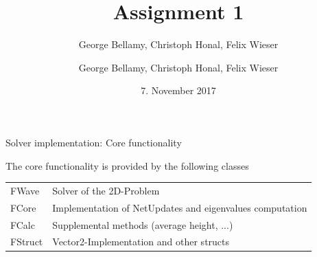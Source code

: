 \documentclass[shortpres]{beamer}
\title[{Tsunami simulation}]{Assignment 1}
\author[Bellamy Honal, Wieser]{George Bellamy, Christoph Honal, Felix Wieser\\\vspace{10pt}{\small Bachelorpraktikum}}
\institute[TU M\"unchen]{Techncal University of Munich}
\author[Bellamy, Honal, Wieser]{George Bellamy, Christoph Honal, Felix Wieser\\\vspace{10pt}{\small Bachelorpraktikum}}
\institute[TU M\"unchen]{Technical University of Munich}
\date{7. November 2017}
\begin{document}
\maketitle

\begin{frame}{Solver implementation: Core functionality}
	\begin{figure}
		{
			\hspace{20pt}
		}
		\only<2>
		{
			\hspace{20pt}
		}
	\end{figure}
	
	The core functionality is provided by the following classes
	\begin{tabular}{ll}
		FWave & Solver of the 2D-Problem\\
		FCore & Implementation of NetUpdates and eigenvalues computation\\
		\pause
		FCalc & Supplemental methods (average height, ...)\\
		FStruct & Vector2-Implementation and other structs
	\end{tabular}
\end{frame}
\end{document}
